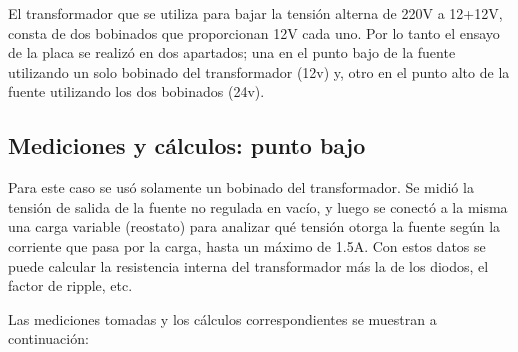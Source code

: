 \documentclass[chaptersright]{informeutn}
\begin{document}
      El transformador que se utiliza para bajar la tensión alterna de 220V a 12+12V, consta de dos bobinados que
      proporcionan 12V cada uno. Por lo tanto el ensayo de la placa se realizó en dos apartados; una en el punto bajo
      de la fuente utilizando un solo bobinado del transformador (12v) y, otro en el punto alto de la fuente utilizando
      los dos bobinados (24v).

      \subsection{Mediciones y cálculos: punto bajo}
        Para este caso se usó solamente un bobinado del transformador. Se midió la tensión de salida de la fuente no
        regulada en vacío, y luego se conectó a la misma una carga variable (reostato) para analizar qué tensión
        otorga la fuente según la corriente que pasa por la carga, hasta un máximo de 1.5A. Con estos datos se puede
        calcular la resistencia interna del transformador más la de los diodos, el factor de ripple, etc.

        Las mediciones tomadas y los cálculos correspondientes se muestran a continuación:
\end{document}
